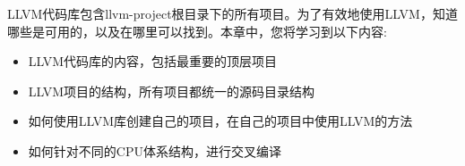 
LLVM代码库包含llvm-project根目录下的所有项目。为了有效地使用LLVM，知道哪些是可用的，以及在哪里可以找到。本章中，您将学习到以下内容:\par

\begin{itemize}
	\item LLVM代码库的内容，包括最重要的顶层项目
	\item LLVM项目的结构，所有项目都统一的源码目录结构
	\item 如何使用LLVM库创建自己的项目，在自己的项目中使用LLVM的方法
	\item 如何针对不同的CPU体系结构，进行交叉编译
\end{itemize}

